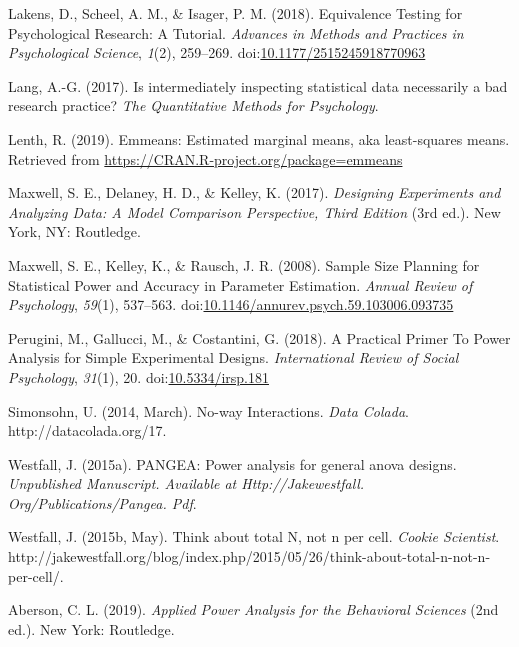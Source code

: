 \documentclass[
  ,man,floatsintext]{apa6}
\begin{document}
\leavevmode\hypertarget{ref-lakens_equivalence_2018}{}%
Lakens, D., Scheel, A. M., \& Isager, P. M. (2018). Equivalence Testing for Psychological Research: A Tutorial. \emph{Advances in Methods and Practices in Psychological Science}, \emph{1}(2), 259--269. doi:\href{https://doi.org/10.1177/2515245918770963}{10.1177/2515245918770963}

\leavevmode\hypertarget{ref-lang2017intermediately}{}%
Lang, A.-G. (2017). Is intermediately inspecting statistical data necessarily a bad research practice? \emph{The Quantitative Methods for Psychology}.

\leavevmode\hypertarget{ref-lenthemmeans}{}%
Lenth, R. (2019). Emmeans: Estimated marginal means, aka least-squares means. Retrieved from \url{https://CRAN.R-project.org/package=emmeans}

\leavevmode\hypertarget{ref-maxwell_designing_2017}{}%
Maxwell, S. E., Delaney, H. D., \& Kelley, K. (2017). \emph{Designing Experiments and Analyzing Data: A Model Comparison Perspective, Third Edition} (3rd ed.). New York, NY: Routledge.

\leavevmode\hypertarget{ref-maxwell_sample_2008}{}%
Maxwell, S. E., Kelley, K., \& Rausch, J. R. (2008). Sample Size Planning for Statistical Power and Accuracy in Parameter Estimation. \emph{Annual Review of Psychology}, \emph{59}(1), 537--563. doi:\href{https://doi.org/10.1146/annurev.psych.59.103006.093735}{10.1146/annurev.psych.59.103006.093735}

\leavevmode\hypertarget{ref-perugini_practical_2018}{}%
Perugini, M., Gallucci, M., \& Costantini, G. (2018). A Practical Primer To Power Analysis for Simple Experimental Designs. \emph{International Review of Social Psychology}, \emph{31}(1), 20. doi:\href{https://doi.org/10.5334/irsp.181}{10.5334/irsp.181}

\leavevmode\hypertarget{ref-simonsohn_no-way_2014}{}%
Simonsohn, U. (2014, March). No-way Interactions. \emph{Data Colada}. http://datacolada.org/17.

\leavevmode\hypertarget{ref-westfall2015pangea}{}%
Westfall, J. (2015a). PANGEA: Power analysis for general anova designs. \emph{Unpublished Manuscript. Available at Http://Jakewestfall. Org/Publications/Pangea. Pdf}.

\leavevmode\hypertarget{ref-westfall_think_2015}{}%
Westfall, J. (2015b, May). Think about total N, not n per cell. \emph{Cookie Scientist}. http://jakewestfall.org/blog/index.php/2015/05/26/think-about-total-n-not-n-per-cell/.

\leavevmode\hypertarget{ref-aberson_applied_2019}{}%
Aberson, C. L. (2019). \emph{Applied Power Analysis for the Behavioral Sciences} (2nd ed.). New York: Routledge.
\end{document}
